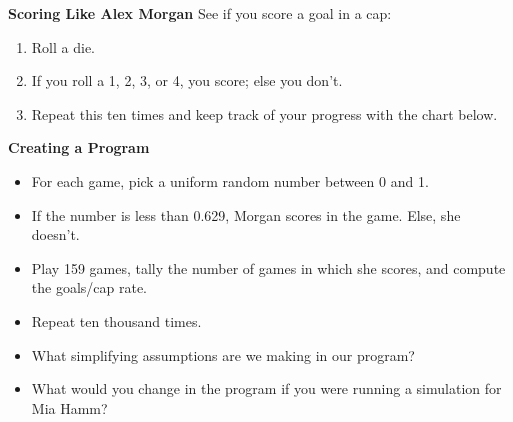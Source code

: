 
\textbf{Scoring Like Alex Morgan}
See if you score a goal in a cap:
\begin{enumerate}
	\item Roll a die.
	\item If you roll a 1, 2, 3, or 4, you score; else you don't.	
	\item Repeat this ten times and keep track of your progress with the chart below.
\end{enumerate}
\begin{center}
\end{center}
\vfill
\textbf{Creating a Program}
\begin{itemize}
	\item For each game, pick a uniform random number between 0 and 1.
	\item If the number is less than 0.629, Morgan scores in the game. Else, she doesn't.
	\item Play 159 games, tally the number of games in which she scores, and compute the goals/cap rate.
	\item Repeat ten thousand times.
\end{itemize}

\begin{itemize}
	\item What simplifying assumptions are we making in our program?\vfill
	\item What would you change in the program if you were running a simulation for Mia Hamm? \vfill
\end{itemize}
